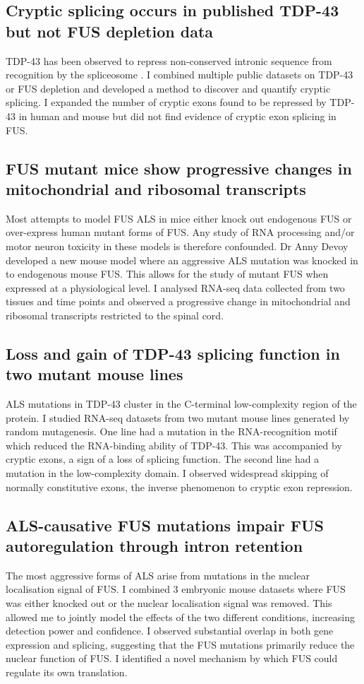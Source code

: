 \subsection{Cryptic splicing occurs in published TDP-43 but not FUS depletion data}
TDP-43 has been observed to repress non-conserved intronic sequence from recognition by the spliceosome \citep{Ling2015}. 
I combined multiple public datasets on TDP-43 or FUS depletion and developed a method to discover and quantify cryptic splicing.
I expanded the number of cryptic exons found to be repressed by TDP-43 in human and mouse but did not find evidence of cryptic exon splicing in FUS.

\subsection{FUS mutant mice show progressive changes in mitochondrial and ribosomal transcripts}
Most attempts to model FUS ALS in mice either knock out endogenous FUS or over-express human mutant forms of FUS. 
Any study of RNA processing and/or motor neuron toxicity in these models is therefore confounded.
Dr Anny Devoy developed a new mouse model where an aggressive ALS mutation was knocked in to endogenous mouse FUS. 
This allows for the study of mutant FUS when expressed at a physiological level. 
I analysed RNA-seq data collected from two tissues and time points and observed a progressive change in mitochondrial and ribosomal transcripts restricted to the spinal cord.

\subsection{Loss and gain of TDP-43 splicing function in two mutant mouse lines}
ALS mutations in TDP-43 cluster in the C-terminal low-complexity region of the protein.
I studied RNA-seq datasets from two mutant mouse lines generated by random mutagenesis. 
One line had a mutation in the RNA-recognition motif which reduced the RNA-binding ability of TDP-43.
This was accompanied by cryptic exons, a sign of a loss of splicing function.
The second line had a mutation in the low-complexity domain.
I observed widespread skipping of normally constitutive exons, the inverse phenomenon to cryptic exon repression.

\subsection{ALS-causative FUS mutations impair FUS autoregulation through intron retention}
The most aggressive forms of ALS arise from mutations in the nuclear localisation signal of FUS.
I combined 3 embryonic mouse datasets where FUS was either knocked out or the nuclear localisation signal was removed.
This allowed me to jointly model the effects of the two different conditions, increasing detection power and confidence.
I observed substantial overlap in both gene expression and splicing, suggesting that the FUS mutations primarily reduce the nuclear function of FUS.
I identified a novel mechanism by which FUS could regulate its own translation.

